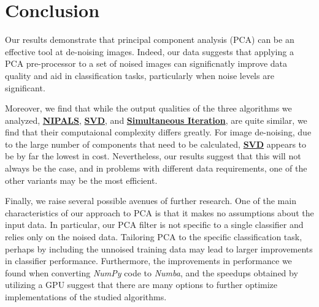 \documentclass[12pt]{article}
\begin{document}
\pagebreak
\section{Conclusion}\label{7}

   Our results demonstrate that principal component analysis (PCA) can be an effective tool at de-noising images. Indeed, our data suggests that applying a PCA pre-processor to a set of noised images can significnatly improve data quality and aid in classification tasks, particularly when noise levels are significant.

    Moreover, we find that while the output qualities of the three algorithms we analyzed, \textbf{\hyperref[3.1]{NIPALS}}, \textbf{\hyperref[3.2]{SVD}}, and \textbf{\hyperref[3.3]{Simultaneous Iteration}}, are quite similar, we find that their computaional complexity differs greatly. For image de-noising, due to the large number of components that need to be calculated, \textbf{\hyperref[3.2]{SVD}} appears to be by far the lowest in cost. Nevertheless, our results suggest that this will not always be the case, and in problems with different data requirements, one of the other variants may be the most efficient.

    Finally, we raise several possible avenues of further research. One of the main characteristics of our approach to PCA is that it makes no assumptions about the input data. In particular, our PCA filter is not specific to a single classifier and relies only on the noised data. Tailoring PCA to the specific classification task, perhaps by including the unnoised training data may lead to larger improvements in classifier performance. Furthermore, the improvements in performance we found when converting \textit{NumPy} code to \textit{Numba}, and the speedups obtained by utilizing a GPU suggest that there are many options to further optimize implementations of the studied algorithms.


\pagebreak





\end{document}
